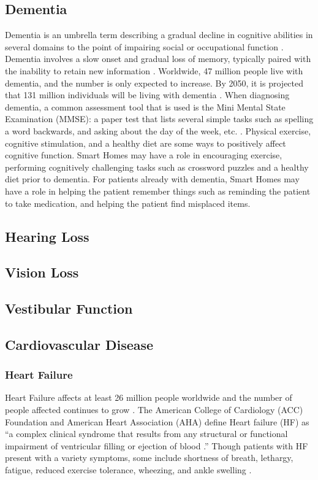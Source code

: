 \subsection{Dementia}
Dementia is an umbrella term describing a gradual decline in cognitive abilities in several domains to the point of impairing social or occupational function \cite{noauthor_diagnosis_nodate}. Dementia involves a slow onset and gradual loss of memory, typically paired with the inability to retain new information \cite{noauthor_diagnosis_nodate}. Worldwide, 47 million people live with dementia, and the number is only expected to increase. By 2050, it is projected that 131 million individuals will be living with dementia \cite{noauthor_diagnosis_nodate}. When diagnosing dementia, a common assessment tool that is used is the Mini Mental State Examination (MMSE): a paper test that lists several simple tasks such as spelling a word backwards, and asking about the day of the week, etc. \cite{arevalo-rodriguez_mini-mental_2015}. Physical exercise, cognitive stimulation, and a healthy diet are some ways to positively affect cognitive function. Smart Homes may have a role in encouraging exercise, performing cognitively challenging tasks such as crossword puzzles and a healthy diet prior to dementia. For patients already with dementia, Smart Homes may have a role in helping the patient remember things such as reminding the patient to take medication, and helping the patient find misplaced items.

\subsection{Hearing Loss}

\subsection{Vision Loss}

\subsection{Vestibular Function}

\subsection{Cardiovascular Disease}

\subsubsection{Heart Failure} 
Heart Failure affects at least 26 million people worldwide and the number of people affected continues to grow \cite{savarese_global_2017}. The American College of Cardiology (ACC) Foundation and American Heart Association (AHA) define Heart failure (HF) as “a complex clinical syndrome that results from any structural or functional impairment of ventricular filling or ejection of blood \cite{ziaeian_epidemiology_2016}.” Though patients with HF present with a variety symptoms, some include shortness of breath, lethargy, fatigue, reduced exercise tolerance, wheezing, and ankle swelling \cite{watson_clinical_2000}.

